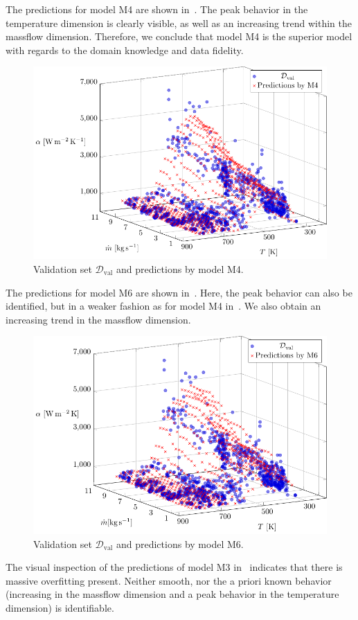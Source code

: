 The predictions for model M4 are shown in~. The peak behavior in the temperature dimension is clearly visible, as well as an increasing trend within the massflow dimension. Therefore, we conclude that model M4 is the superior model with regards to the domain knowledge and data fidelity. 

\begin{figure}[H]
	\centering
	\includegraphics[width=\columnwidth]{graphics/pgfplots/cha5/Ebner/M4.pdf}
	\caption{Validation set $\mathcal{D}_{\text{val}}$ and predictions by model M4.}
	\label{fig:ebner-M4}
\end{figure}

The predictions for model M6 are shown in~. Here, the peak behavior can also be identified, but in a weaker fashion as for model M4 in~. We also obtain an increasing trend in the massflow dimension. 

\begin{figure}[H]
	\centering
	\includegraphics[width=\columnwidth]{graphics/pgfplots/cha5/Ebner/M6.pdf}
	\caption{Validation set $\mathcal{D}_{\text{val}}$ and predictions by model M6.}
	\label{fig:ebner-M6}
\end{figure}
%
The visual inspection of the predictions of model M3 in~ indicates that there is massive overfitting present. Neither smooth, nor the a priori known behavior (increasing in the massflow dimension and a peak behavior in the temperature dimension) is identifiable.  

